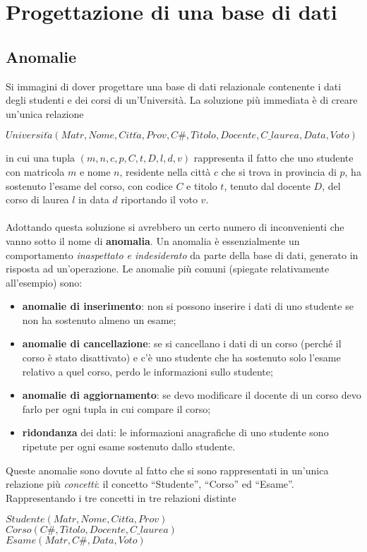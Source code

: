 \section{Progettazione di una base di dati}
\subsection{Anomalie}
Si immagini di dover progettare una base di dati relazionale contenente i dati degli 
studenti e dei corsi di un'Università. La soluzione più immediata è di creare un’unica
relazione
\begin{center}
  $Universit\grave{a}(Matr, Nome, Citt\grave{a}, Prov, C\#, Titolo, Docente, C\_laurea,
  Data, Voto)$ 
\end{center}

in cui una tupla $(m, n, c, p, C, t, D, l, d, v)$ rappresenta il fatto che uno studente
con matricola $m$ e nome $n$, residente nella città $c$ che si trova in provincia di $p$,
ha sostenuto l’esame del corso, con codice $C$ e titolo $t$, tenuto dal docente $D$, del 
corso di laurea $l$ in data $d$ riportando il voto $v$.\\\\
Adottando questa soluzione si avrebbero un certo numero di inconvenienti che vanno sotto 
il nome di \textbf{anomalia}. Un anomalia è essenzialmente un comportamento \emph{inaspettato
e indesiderato} da parte della base di dati, generato in risposta ad un'operazione. Le anomalie 
più comuni (spiegate relativamente all'esempio) sono:
\begin{itemize}
 \item \textbf{anomalie di inserimento}: non si possono inserire i dati di uno studente 
 se non ha sostenuto almeno un esame;
 \item \textbf{anomalie di cancellazione}: se si cancellano i dati di un corso (perché il
 corso è stato disattivato) e c’è uno studente che ha sostenuto solo l’esame relativo a 
 quel corso, perdo le informazioni sullo studente;
 \item \textbf{anomalie di aggiornamento}: se devo modificare il docente di un corso devo 
 farlo per ogni tupla in cui compare il corso;
 \item \textbf{ridondanza} dei dati: le informazioni anagrafiche di uno studente sono
  ripetute per ogni esame sostenuto dallo studente.
\end{itemize}
Queste anomalie sono dovute al fatto che si sono rappresentati in un’unica relazione più 
\emph{concetti}: il concetto ``Studente'', ``Corso'' ed ``Esame''. Rappresentando i tre 
concetti in tre relazioni distinte
\begin{center}
  $Studente(Matr, Nome, Citt\grave{a}, Prov)$\\
  $Corso(C\#, Titolo, Docente, C\_laurea)$\\
  $Esame(Matr, C\#, Data, Voto)$
\end{center}

